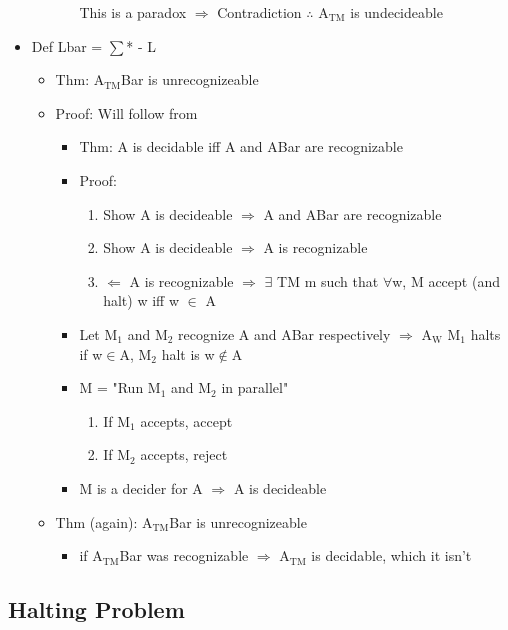 \documentclass[11pt]{article}
\begin{document}
\begin{itemize}
\begin{itemize}
\begin{itemize}
  This is a paradox \(\Rightarrow\) Contradiction
  \(\therefore\) A\(_{\text{TM}}\) is undecideable
\end{itemize}
\end{itemize}
\item Def Lbar = \(\sum\)* - L
\begin{itemize}
\item Thm: A\(_{\text{TM}}\)Bar is unrecognizeable
\item Proof: Will follow from 
\begin{itemize}
\item Thm: A is decidable iff A and ABar are recognizable
\item Proof: 
\begin{enumerate}
\item Show A is decideable \(\Rightarrow\) A and ABar are recognizable
\item Show A is decideable \(\Rightarrow\) A is recognizable
\item \(\Leftarrow\) A is recognizable \(\Rightarrow\) \(\exists\) TM m such that \(\forall\)w, M accept (and halt) w iff w \(\in\) A
\end{enumerate}
\end{itemize}
\begin{itemize}
\item Let M\(_{\text{1}}\) and M\(_{\text{2}}\) recognize A and ABar respectively \(\Rightarrow\) A\(_{\text{W}}\) M\(_{\text{1}}\) halts if w\(\in\)A, M\(_{\text{2}}\) halt is w\(\notin\)A
\item M = "Run M\(_{\text{1}}\) and M\(_{\text{2}}\) in parallel"
\begin{enumerate}
\item If M\(_{\text{1}}\) accepts, accept
\item If M\(_{\text{2}}\) accepts, reject
\end{enumerate}
\item M is a decider for A \(\Rightarrow\) A is decideable
\end{itemize}
\item Thm (again): A\(_{\text{TM}}\)Bar is unrecognizeable
\begin{itemize}
\item if A\(_{\text{TM}}\)Bar was recognizable \(\Rightarrow\) A\(_{\text{TM}}\) is decidable, which it isn't
\end{itemize}
\end{itemize}
\end{itemize}
\subsection{Halting Problem}
\label{sec:orgbc2d5ee}
\end{document}
